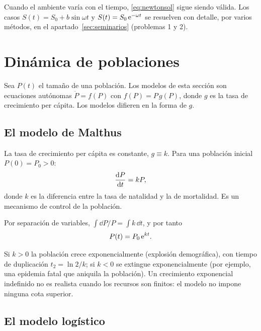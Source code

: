 \documentclass[11pt,twoside]{article}
\begin{document}
Cuando el ambiente varía con el tiempo, \eqref{eq:newtonsol} sigue siendo válida. Los casos $S(t)=S_0+b\sin\omega t$ y
$S(t)=S_0\,\mathrm{e}^{-\omega t}$ se resuelven con detalle, por varios métodos, en el apartado~\ref{sec:seminarios} (problemas 1 y 2).

\section{Dinámica de poblaciones}\label{sec:poblaciones}

Sea $P(t)$ el tamaño de una población. Los modelos de esta sección son ecuaciones autónomas $\dot P=f(P)$ con
$f(P)=P\,g(P)$, donde $g$ es la tasa de crecimiento per cápita. Los modelos difieren en la forma de $g$.

\subsection{El modelo de Malthus}

\begin{definicion}
La tasa de crecimiento per cápita es constante, $g\equiv k$. Para una población inicial $P(0)=P_0>0$:
\begin{equation}\label{eq:malthus}
\frac{\mathrm{d}P}{\mathrm{d}t}=kP,
\end{equation}
donde $k$ es la diferencia entre la tasa de natalidad y la de mortalidad. Es un mecanismo de control de la población.
\end{definicion}

Por separación de variables, $\int\dd P/P=\int k\,\dd t$, y por tanto
\begin{equation}\label{eq:malthussol}
P(t)=P_0\,\mathrm{e}^{kt}.
\end{equation}

Si $k>0$ la población crece exponencialmente (explosión demográfica), con tiempo de duplicación $t_2=\ln2/k$; si $k<0$ se
extingue exponencialmente (por ejemplo, una epidemia fatal que aniquila la población). Un crecimiento exponencial
indefinido no es realista cuando los recursos son finitos: el modelo no impone ninguna cota superior.

\subsection{El modelo logístico}
\end{document}
